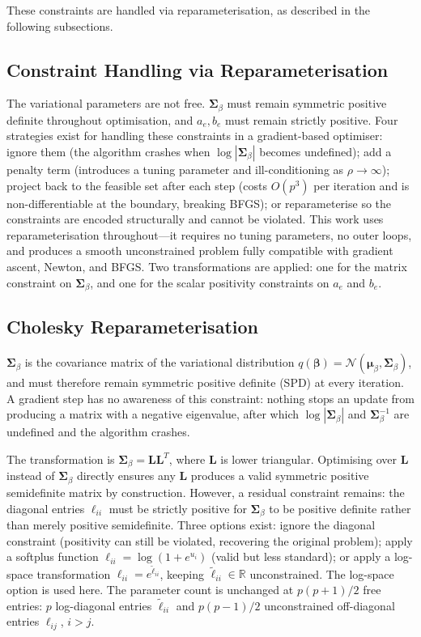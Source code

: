 \documentclass[11pt]{article}
\newcommand{\R}{\mathbb{R}}
\newcommand{\N}{\mathcal{N}}
\begin{document}
These constraints are handled via reparameterisation, as described in the following subsections.

\subsection*{Constraint Handling via Reparameterisation}

The variational parameters are not free. $\bm{\Sigma}_\beta$ must remain symmetric positive definite throughout optimisation, and $a_e, b_e$ must remain strictly positive. Four strategies exist for handling these constraints in a gradient-based optimiser: ignore them (the algorithm crashes when $\log|\bm{\Sigma}_\beta|$ becomes undefined); add a penalty term (introduces a tuning parameter and ill-conditioning as $\rho \to \infty$); project back to the feasible set after each step (costs $O(p^3)$ per iteration and is non-differentiable at the boundary, breaking BFGS); or reparameterise so the constraints are encoded structurally and cannot be violated. This work uses reparameterisation throughout---it requires no tuning parameters, no outer loops, and produces a smooth unconstrained problem fully compatible with gradient ascent, Newton, and BFGS. Two transformations are applied: one for the matrix constraint on $\bm{\Sigma}_\beta$, and one for the scalar positivity constraints on $a_e$ and $b_e$.

\subsection*{Cholesky Reparameterisation}

$\bm{\Sigma}_\beta$ is the covariance matrix of the variational distribution $q(\bm{\beta}) = \N(\bm{\mu}_\beta, \bm{\Sigma}_\beta)$, and must therefore remain symmetric positive definite (SPD) at every iteration. A gradient step has no awareness of this constraint: nothing stops an update from producing a matrix with a negative eigenvalue, after which $\log|\bm{\Sigma}_\beta|$ and $\bm{\Sigma}_\beta^{-1}$ are undefined and the algorithm crashes.

The transformation is $\bm{\Sigma}_\beta = \bm{L}\bm{L}^T$, where $\bm{L}$ is lower triangular. Optimising over $\bm{L}$ instead of $\bm{\Sigma}_\beta$ directly ensures any $\bm{L}$ produces a valid symmetric positive semidefinite matrix by construction. However, a residual constraint remains: the diagonal entries $\ell_{ii}$ must be strictly positive for $\bm{\Sigma}_\beta$ to be positive definite rather than merely positive semidefinite. Three options exist: ignore the diagonal constraint (positivity can still be violated, recovering the original problem); apply a softplus function $\ell_{ii} = \log(1 + e^{u_i})$ (valid but less standard); or apply a log-space transformation $\ell_{ii} = e^{\tilde{\ell}_{ii}}$, keeping $\tilde{\ell}_{ii} \in \R$ unconstrained. The log-space option is used here. The parameter count is unchanged at $p(p+1)/2$ free entries: $p$ log-diagonal entries $\tilde{\ell}_{ii}$ and $p(p-1)/2$ unconstrained off-diagonal entries $\ell_{ij}$, $i > j$.
\end{document}
